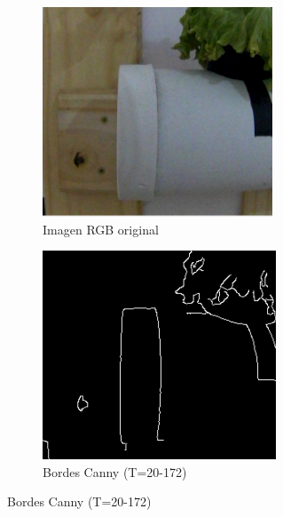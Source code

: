 \begin{figure}[H]
\centering
\begin{subfigure}[b]{0.48\textwidth}
    \centering
    \includegraphics[width=\textwidth]{imagenes/detector_tubos_1_original.png}
    \caption{Imagen RGB original}
\end{subfigure}
\hfill
\begin{subfigure}[b]{0.48\textwidth}
    \centering
    \includegraphics[width=\textwidth]{imagenes/detector_tubos_2_canny.png}
    \caption{Bordes Canny (T=20-172)}
\end{subfigure}


\end{figure}
